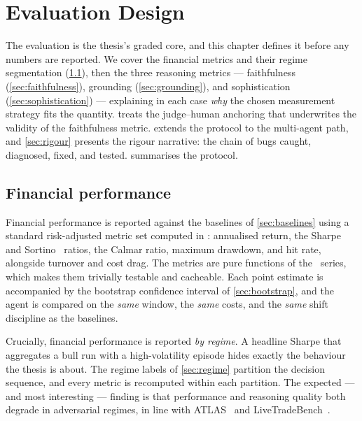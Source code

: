 \chapter{Evaluation Design}
\label{ch:evaluation}

The evaluation is the thesis's graded core, and this chapter defines it before any numbers
are reported. We cover the financial metrics and their regime segmentation
(\cref{sec:finmetrics}), then the three reasoning metrics --- faithfulness
(\cref{sec:faithfulness}), grounding (\cref{sec:grounding}), and sophistication
(\cref{sec:sophistication}) --- explaining in each case \emph{why} the chosen measurement
strategy fits the quantity.  treats the judge--human anchoring that
underwrites the validity of the faithfulness metric.  extends the protocol
to the multi-agent path, and \cref{sec:rigour} presents the rigour narrative: the chain of
bugs caught, diagnosed, fixed, and tested.  summarises the protocol.



\section{Financial performance}
\label{sec:finmetrics}

Financial performance is reported against the baselines of \cref{sec:baselines} using a
standard risk-adjusted metric set computed in : annualised return,
the Sharpe~\cite{sharpe1994} and Sortino~\cite{sortino1994} ratios, the Calmar ratio,
maximum drawdown, and hit rate, alongside turnover and cost drag. The metrics are pure
functions of the \nav\ series, which makes them trivially testable and cacheable. Each point
estimate is accompanied by the bootstrap confidence interval of \cref{sec:bootstrap}, and
the agent is compared on the \emph{same} window, the \emph{same} costs, and the \emph{same}
shift discipline as the baselines.

Crucially, financial performance is reported \emph{by regime}. A headline Sharpe that
aggregates a bull run with a high-volatility episode hides exactly the behaviour the thesis
is about. The regime labels of \cref{sec:regime} partition the decision sequence, and every
metric is recomputed within each partition. The expected --- and most interesting ---
finding is that performance and reasoning quality both degrade in adversarial regimes, in
line with ATLAS~\cite{atlas2025} and LiveTradeBench~\cite{livetradebench2025}.

